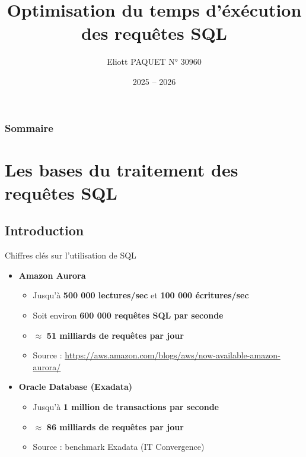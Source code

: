 \documentclass[aspectratio=43,12pt]{beamer}
\title[Optimisation du plan et de l’exécution de requêtes SQL]{Optimisation du temps d'éxécution des requêtes SQL}
\author{Eliott PAQUET N° 30960}
\date{2025 -- 2026}
\begin{document}
\begin{frame}
    \titlepage
\end{frame}

\begin{frame}
    \frametitle{Sommaire}
    \tableofcontents[hideothersubsections]

\end{frame}


\section{Les bases du traitement des requêtes SQL}
\subsection{Introduction}
\begin{frame}{Chiffres clés sur l'utilisation de SQL}

    \begin{itemize}

        \item \textbf{Amazon Aurora}
              \begin{itemize}
                  \item Jusqu'à \textbf{500 000 lectures/sec} et \textbf{100 000 écritures/sec}
                  \item Soit environ \textbf{600 000 requêtes SQL par seconde}
                  \item $\approx$ \textbf{51 milliards de requêtes par jour}
                  \item Source : \url{https://aws.amazon.com/blogs/aws/now-available-amazon-aurora/}
              \end{itemize}

              \vspace{0.5cm}

        \item \textbf{Oracle Database (Exadata)}
              \begin{itemize}
                  \item Jusqu'à \textbf{1 million de transactions par seconde}
                  \item $\approx$ \textbf{86 milliards de requêtes par jour}
                  \item Source : benchmark Exadata (IT Convergence)
              \end{itemize}
    \end{itemize}

\end{frame}
\end{document}
